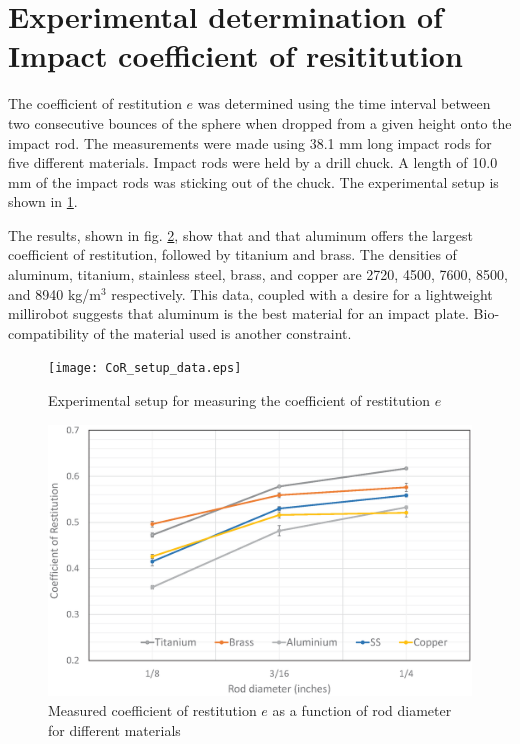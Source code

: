 \documentclass[letterpaper, 10 pt, conference]{ieeeconf}  %
\begin{document}
\section{Experimental determination of Impact coefficient of resititution}
\label{cor_det}
The coefficient of restitution $e$ was determined using the time interval between two consecutive bounces of the sphere when dropped from a given height onto the impact rod. The measurements were made using 38.1 mm long impact rods for five different materials. Impact rods were held by a drill chuck. A length of 10.0 mm of the impact rods was sticking out of the chuck. The experimental setup is shown in \cref{CoR_setup_data}.

The results, shown in fig. \ref{CoR_Results}, show that and that aluminum offers the largest coefficient of restitution, followed by titanium and brass. The densities of aluminum, titanium, stainless steel, brass, and copper are 2720, 4500, 7600, 8500, and 8940 kg/m$^3$ respectively. This data, coupled with a desire for a lightweight millirobot suggests that aluminum is the best material for an impact plate. Bio-compatibility of the material used is another constraint.

\begin{figure}
	\texttt{[image: CoR\_setup\_data.eps]}
	\caption{Experimental setup for measuring the coefficient of restitution $e$}
	\label{CoR_setup_data}
\end{figure}

\begin{figure}
	\includegraphics[width=\columnwidth]{CoR_measurements.eps}
	\caption{Measured coefficient of restitution $e$ as a function of rod diameter for different materials}
	\label{CoR_Results}
\end{figure}
\end{document}
